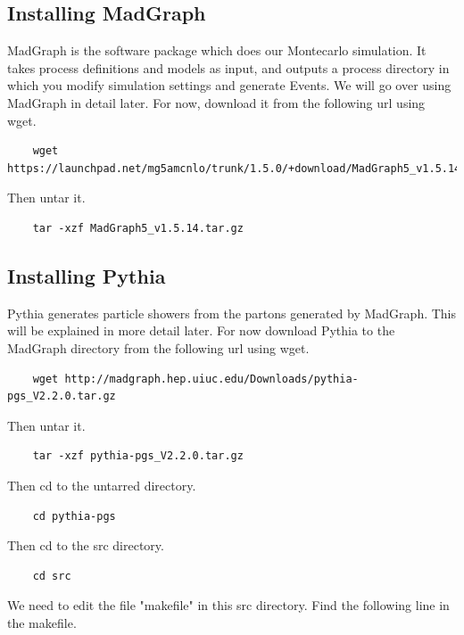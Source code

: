\documentclass{article}
\begin{document}
\subsection{Installing MadGraph}

MadGraph is the software package which does our Montecarlo simulation. It takes process definitions and models as input, and outputs a process directory in which you modify simulation settings and generate Events. We will go over using MadGraph in detail later. For now, download it from the following url using wget.

\begin{verbatim}
	wget https://launchpad.net/mg5amcnlo/trunk/1.5.0/+download/MadGraph5_v1.5.14.tar.gz
\end{verbatim}

Then untar it.

\begin{verbatim}
	tar -xzf MadGraph5_v1.5.14.tar.gz
\end{verbatim}

\subsection{Installing Pythia}

Pythia generates particle showers from the partons generated by MadGraph. This will be explained in more detail later. For now download Pythia to the MadGraph directory from the following url using wget.

\begin{verbatim}
	wget http://madgraph.hep.uiuc.edu/Downloads/pythia-pgs_V2.2.0.tar.gz
\end{verbatim}

Then untar it.

\begin{verbatim}
	tar -xzf pythia-pgs_V2.2.0.tar.gz
\end{verbatim}

Then cd to the untarred directory.

\begin{verbatim}
	cd pythia-pgs
\end{verbatim}

Then cd to the src directory.

\begin{verbatim}
	cd src
\end{verbatim}

We need to edit the file "makefile" in this src directory. Find the following line in the makefile.
\end{document}
